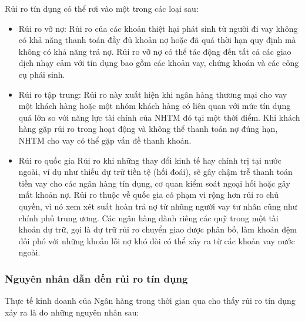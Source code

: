 Rủi ro tín dụng có thể rơi vào một trong các loại sau:
\begin{itemize}
\item Rủi ro vỡ nợ: Rủi ro của các khoản thiệt hại phát sinh từ người đi vay không có khả năng thanh toán đầy đủ khoản nợ hoặc đã quá thời hạn quy định mà không có khả năng trả nợ. Rủi ro vỡ nợ có thể tác động đến tất cả các giao dịch nhạy cảm với tín dụng bao gồm các khoản vay, chứng khoán và các công cụ phái sinh.
\item Rủi ro tập trung: Rủi ro này xuất hiện khi ngân hàng thương mại cho vay một khách hàng hoặc một nhóm khách hàng có liên quan với mức tín dụng quá lớn so với năng lực tài chính của NHTM đó tại một thời điểm. Khi khách hàng gặp rủi ro trong hoạt động và không thể thanh toán nợ đúng hạn, NHTM cho vay có thể gặp vấn đề thanh khoản.
\item Rủi ro quốc gia Rủi ro khi những thay đổi kinh tế hay chính trị tại nước ngoài, ví dụ như thiếu dự trữ tiền tệ (hối đoái), sẽ gây chậm trễ thanh toán tiền vay cho các  ngân hàng tín dụng, cơ quan kiểm soát ngoại hối hoặc gây mất khoản nợ. Rủi ro thuộc về quốc gia có phạm vi rộng hơn rủi ro chủ quyền, vì nó xem xét suất hoàn trả nợ từ nhũng người vay tư nhân cũng như chính phủ trung ương. Các ngân hàng dành riêng các quỹ trong một tài khoản dự trữ, gọi là dự trữ rủi ro chuyển giao được phân bố, làm khoản đệm đối phó với những khoản lỗi nợ khó đòi có thể xảy ra từ các khoản vay nước ngoài.
\end{itemize}

\subsubsection{Nguyên nhân dẫn đến rủi ro tín dụng}
Thực tế kinh doanh của Ngân hàng trong thời gian qua cho thấy rủi ro tín dụng xảy ra là do những nguyên nhân sau:

